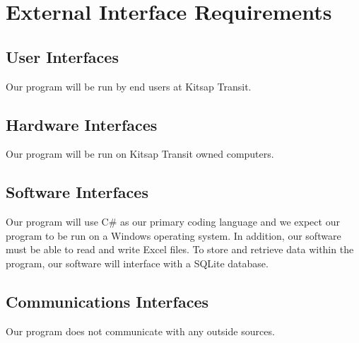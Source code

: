 \section{External Interface Requirements}

\subsection{User Interfaces}
Our program will be run by end users at Kitsap Transit.

\subsection{Hardware Interfaces}
Our program will be run on Kitsap Transit owned computers.

\subsection{Software Interfaces}
Our program will use C\# as our primary coding language and we expect our program to be run on a Windows operating system. In addition, our software must be able to read and write Excel files. To store and retrieve data within the program, our software will interface with a SQLite database.

\subsection{Communications Interfaces}
Our program does not communicate with any outside sources.
